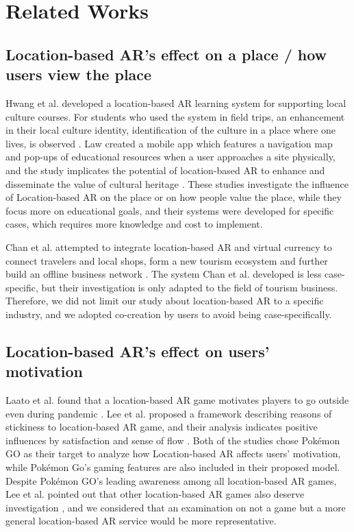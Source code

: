 \chapter{Related Works} \label{ch:3}

\section{Location-based AR's effect on a place / how users view the place}
Hwang et al. developed a location-based AR learning system for supporting local culture courses.
For students who used the system in field trips, an enhancement in their local culture identity,
identification of the culture in a place where one lives, is observed \cite{hwang_chang_chen_chen_2017}.
Law created a mobile app which features a navigation map and pop-ups of educational resources when a user approaches a site physically,
and the study implicates the potential of location-based AR to enhance and disseminate the value of cultural heritage \cite{law_2018}.
These studies investigate the influence of Location-based AR on the place or on how people value the place,
while they focus more on educational goals, and their systems were developed for specific cases, which requires more knowledge and cost to implement.

Chan et al. attempted to integrate location-based AR and virtual currency to connect travelers and local shops,
form a new tourism ecosystem and further build an offline business network \cite{chan_lin_wang_lu_hsu_2017}.
The system Chan et al. developed is less case-specific, but their investigation is only adapted to the field of tourism business.
Therefore, we did not limit our study about location-based AR to a specific industry, and we adopted co-creation by users to avoid being case-specifically.

\section{Location-based AR's effect on users' motivation}
Laato et al. found that a location-based AR game motivates players to go outside even during pandemic \cite{laato_islam_laine_2020}.
Lee et al. proposed a framework describing reasons of stickiness to location-based AR game,
and their analysis indicates positive influences by satisfaction and sense of flow \cite{lee_chiang_hsiao_2018}.
Both of the studies chose Pokémon GO as their target to analyze how Location-based AR affects users' motivation,
while Pokémon Go's gaming features are also included in their proposed model.
Despite Pokémon GO's leading awareness among all location-based AR games,
Lee et al. pointed out that other location-based AR games also deserve investigation \cite{lee_chiang_hsiao_2018},
and we considered that an examination on not a game but a more general location-based AR service would be more representative.

